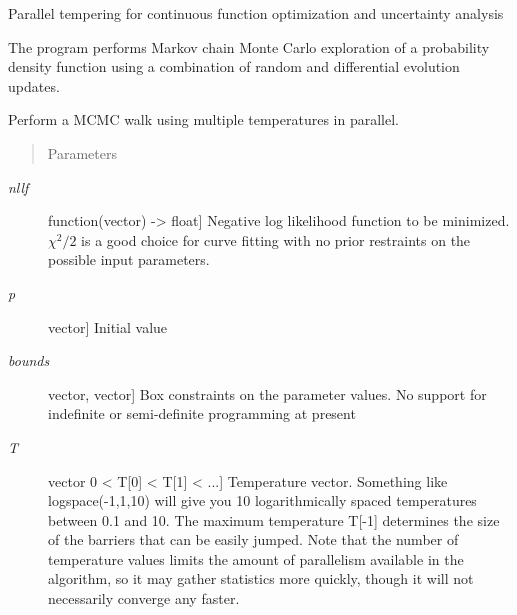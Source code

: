 \documentclass[letterpaper,10pt,english]{sphinxmanual}
\begin{document}
\label{api/partemp:module-refl1d.partemp}
Parallel tempering for continuous function optimization and uncertainty analysis

The program performs Markov chain Monte Carlo exploration of a probability
density function using a combination of random and differential evolution
updates.

\begin{fulllineitems}
\label{api/partemp:refl1d.partemp.parallel_tempering}
Perform a MCMC walk using multiple temperatures in parallel.
\begin{quote}\begin{description}
\item[{Parameters }] \leavevmode
\end{description}\end{quote}
\begin{description}
\item[{\emph{nllf}}] \leavevmode{[}function(vector) -\textgreater{} float{]}
Negative log likelihood function to be minimized.  $\chi^2/2$ is a
good choice for curve fitting with no prior restraints on the possible
input parameters.

\item[{\emph{p}}] \leavevmode{[}vector{]}
Initial value

\item[{\emph{bounds}}] \leavevmode{[}vector, vector{]}
Box constraints on the parameter values.  No support for indefinite
or semi-definite programming at present

\item[{\emph{T}}] \leavevmode{[}vector \textbar{} 0 \textless{} T{[}0{]} \textless{} T{[}1{]} \textless{} ...{]}
Temperature vector.  Something like logspace(-1,1,10) will give
you 10 logarithmically spaced temperatures between 0.1 and 10.  The
maximum temperature T{[}-1{]} determines the size of the barriers that
can be easily jumped.  Note that the number of temperature values
limits the amount of parallelism available in the algorithm, so it
may gather statistics more quickly, though it will not necessarily
converge any faster.


\end{description}
\end{fulllineitems}
\end{document}
